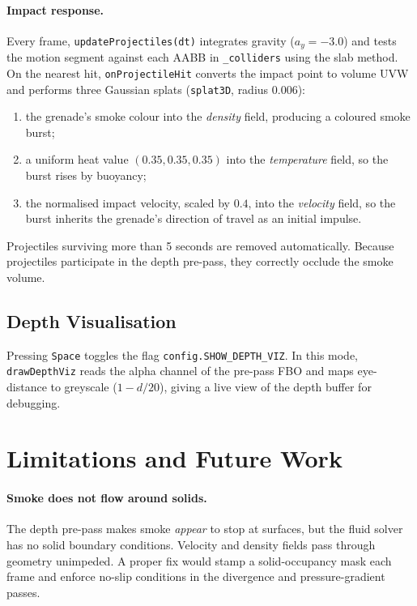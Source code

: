 \documentclass[a4paper, 12pt]{article}
\begin{document}
\paragraph{Impact response.}
Every frame, \texttt{updateProjectiles(dt)} integrates gravity
($a_y=-3.0$) and tests the motion segment against each AABB in
\texttt{\_colliders} using the slab method.
On the nearest hit, \texttt{onProjectileHit} converts the impact point to
volume UVW and performs three Gaussian splats (\texttt{splat3D}, radius
0.006):
\begin{enumerate}[nosep]
  \item the grenade's smoke colour into the \emph{density} field, producing a
        coloured smoke burst;
  \item a uniform heat value $(0.35,0.35,0.35)$ into the \emph{temperature}
        field, so the burst rises by buoyancy;
  \item the normalised impact velocity, scaled by $0.4$, into the
        \emph{velocity} field, so the burst inherits the grenade's direction
        of travel as an initial impulse.
\end{enumerate}
Projectiles surviving more than 5 seconds are removed automatically.
Because projectiles participate in the depth pre-pass, they correctly
occlude the smoke volume.

\subsection{Depth Visualisation}

Pressing \texttt{Space} toggles the flag
\texttt{config.SHOW\_DEPTH\_VIZ}.
In this mode, \texttt{drawDepthViz} reads the alpha channel of the pre-pass
FBO and maps eye-distance to greyscale ($1 - d/20$), giving a live view of
the depth buffer for debugging.

\section{Limitations and Future Work}

\paragraph{Smoke does not flow around solids.}
The depth pre-pass makes smoke \emph{appear} to stop at surfaces, but the
fluid solver has no solid boundary conditions.
Velocity and density fields pass through geometry unimpeded.
A proper fix would stamp a solid-occupancy mask each frame and enforce
no-slip conditions in the divergence and pressure-gradient passes.
\end{document}
